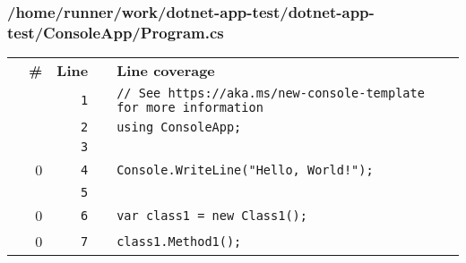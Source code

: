 \documentclass[a4paper,landscape,10pt]{article}
\begin{document}
\subsubsection{/home/runner/work/dotnet-app-test/dotnet-app-test/ConsoleApp/Program.cs}
\begin{longtable}[l]{lrrll}
\textbf{} & \textbf{\#} & \textbf{Line} & \textbf{} & \textbf{Line coverage}\\
\cellcolor{gray} &  & \verb~1~ & & \verb~// See https://aka.ms/new-console-template for more information~\\
\cellcolor{gray} &  & \verb~2~ & & \verb~using ConsoleApp;~\\
\cellcolor{gray} &  & \verb~3~ & & \verb~~\\
\cellcolor{red} & 0 & \verb~4~ & & \verb~Console.WriteLine("Hello, World!");~\\
\cellcolor{gray} &  & \verb~5~ & & \verb~~\\
\cellcolor{red} & 0 & \verb~6~ & & \verb~var class1 = new Class1();~\\
\cellcolor{red} & 0 & \verb~7~ & & \verb~class1.Method1();~\\
\end{longtable}
\end{document}
